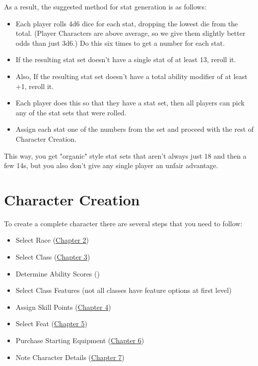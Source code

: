 As a result, the suggested method for stat generation is as follows:
\begin{itemize}
\item Each player rolls 4d6 dice for each stat, dropping the lowest die from the total. (Player Characters are above average, so we give them slightly better odds than just 3d6.) Do this six times to get a number for each stat.
\item If the resulting stat set doesn't have a single stat of at least 13, reroll it.
\item Also, If the resulting stat set doesn't have a total ability modifier of at least +1, reroll it.
\item Each player does this so that they have a stat set, then all players can pick any of the stat sets that were rolled.
\item Assign each stat one of the numbers from the set and proceed with the rest of Character Creation.
\end{itemize}
This way, you get "organic" style stat sets that aren't always just 18 and then a few 14s, but you also don't give any single player an unfair advantage.

\section{Character Creation}

To create a complete character there are several steps that you need to follow:

\begin{itemize}
\item Select Race (\hyperref[chapter:Races]{Chapter 2})
\item Select Class (\hyperref[chapter:Classes]{Chapter 3})
\item Determine Ability Scores ()
\item Select Class Features (not all classes have feature options at first level)
\item Assign Skill Points (\hyperref[chapter:Skills]{Chapter 4})
\item Select Feat (\hyperref[chapter:Feats]{Chapter 5})
\item Purchase Starting Equipment (\hyperref[chapter:Equipment]{Chapter 6})
\item Note Character Details (\hyperref[chapter:Description]{Chapter 7})
\end{itemize}

